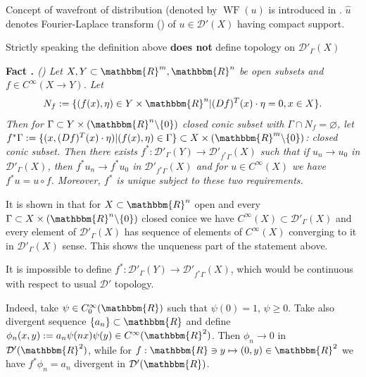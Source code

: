 \documentclass{article}
\newcommand{\assign}{:=}
\newcommand{\tmop}[1]{\ensuremath{\operatorname{#1}}}
\newcommand{\tmtextbf}[1]{{\bfseries{#1}}}
\newcommand{\tmtextit}[1]{{\itshape{#1}}}
\newcommand{\tmtextup}[1]{{\upshape{#1}}}
\numberwithin{definition}{section}
\numberwithin{lemma}{section}
\numberwithin{proposition}{section}
{\theorembodyfont{\rmfamily}\newtheorem{remark}{Remark}
\numberwithin{remark}{section}
}
\begin{document}
\begin{remark}
  Concept of wavefront of distribution (denoted by $\tmop{WF} ( u)$ is
  introduced in {\cite{hormander1983analysis}}. $\hat{u}$ denotes
  Fourier-Laplace transform ({\cite[sec. 7.1]{hormander1983analysis}}) of $u
  \in \mathcal{D}' ( X)$ having compact support.
\end{remark}

\begin{remark}
  Strictly speaking the definition above \tmtextbf{does not} define topology
  on $\mathcal{D}'_{\Gamma} ( X)$
\end{remark}

{\noindent}\tmtextbf{Fact \tmtextup{2}.
}\tmtextit{\label{holomorphicity-preserving:fact-pullback}({\cite[thm.
8.2.4]{hormander1983analysis}}) Let $X, Y \subset \mathbbm{R}^m,
\mathbbm{R}^n$ be open subsets and $f \in C^{\infty} ( X \rightarrow Y)$. Let
\[ N_f \assign \{ ( f ( x), \eta) \in Y \times \mathbbm{R}^n | ( D f)^T ( x)
   \cdot \eta = 0, x \in X \} . \]
Then for $\Gamma \subset Y \times ( \mathbbm{R}^n \backslash \{ 0 \})$ closed
conic subset with $\Gamma \cap N_f = \varnothing$, let $f^{\ast} \Gamma
\assign \{ ( x, ( D f)^T ( x) \cdot \eta) | ( f ( x), \eta) \in \Gamma \}
\subset X \times ( \mathbbm{R}^m \backslash \{ 0 \})$: closed conic subset.
Then there exists $f^{\ast} : \mathcal{D}'_{\Gamma} ( Y) \rightarrow
\mathcal{D}'_{f^{\ast} \Gamma} ( X)$ such that if $u_n \rightarrow u_0$ in
$\mathcal{D}'_{\Gamma} ( X)$, then $f^{\ast} u_n \rightarrow f^{\ast} u_0$ in
$\mathcal{D}'_{f^{\ast} \Gamma} ( X)$ and for $u \in C^{\infty} ( X)$ we have
$f^{\ast} u = u \circ f$. Moreover, $f^{\ast}$ is unique subject to these two
requirements.}{\hspace*{\fill}}{\medskip}

\begin{remark}
  It is shown in {\cite[sec. 8.2]{hormander1983analysis}} that for $X \subset
  \mathbbm{R}^n$ open and every $\Gamma \subset X \times ( \mathbbm{R}^n
  \backslash \{ 0 \})$ closed conice we have $C^{\infty} ( X) \subset
  \mathcal{D}'_{\Gamma} ( X)$ and every element of $\mathcal{D}'_{\Gamma} (
  X)$ has sequence of elements of $C^{\infty} ( X)$ converging to it in
  $\mathcal{D}'_{\Gamma} ( X)$ sense. This shows the unqueness part of the
  statement above.
\end{remark}

\begin{remark}
  It is impossible to define $f^{\ast} : \mathcal{D}'_{\Gamma} ( Y)
  \rightarrow \mathcal{D}'_{f^{\ast} \Gamma} ( X)$, which would be continuous
  with respect to usual $\mathcal{D}'$ topology.
  
  Indeed, take $\psi \in C^{\infty}_0 ( \mathbbm{R})$ such that $\psi ( 0) =
  1$, $\psi \geqslant 0$. Take also divergent sequence $\{ a_n \} \subset
  \mathbbm{R}$ and define $\phi_n ( x, y) \assign a_n \psi ( n x) \psi ( y)
  \in C^{\infty}_{} ( \mathbbm{R}^2)$. Then $\phi_n \rightarrow 0$ in
  $\mathcal{D}' ( \mathbbm{R}^2)$, while for $f : \mathbbm{R} \ni y \mapsto (
  0, y) \in \mathbbm{R}^2$ we have $f^{\ast} \phi_n = a_n$ divergent in
  $\mathcal{D}' ( \mathbbm{R})$.
\end{remark}
\end{document}
